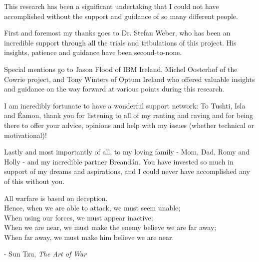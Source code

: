 \documentclass[a4paper, 12pt, oneside]{report}
\begin{document}

\thesistitlepage                            %

\thesisdeclarationpage				  		%


\thesissummarypage

\begin{thesisacknowledgments}               %
This research has been a significant undertaking that I could not have accomplished without the support and guidance of so many different people. 

First and foremost my thanks goes to Dr. Stefan Weber, who has been an incredible support through all the trials and tribulations of this project. His insights, patience and guidance have been second-to-none.

Special mentions go to Jason Flood of IBM Ireland, Michel Oosterhof of the Cowrie project, and Tony Winters of Optum Ireland who offered valuable insights and guidance on the way forward at various points during this research.

I am incredibly fortunate to have a wonderful support network: To Tushti, Isla and {\'E}amon, thank you for listening to all of my ranting and raving and for being there to offer your advice, opinions and help with my issues (whether technical or motivational)!

Lastly and most importantly of all, to my loving family - Mom, Dad, Romy and Holly - and my incredible partner Breand{\'a}n. You have invested so much in support of my dreams and aspirations, and I could never have accomplished any of this without you.
\end{thesisacknowledgments}                 %

\null\vfill
{\centering
\parbox{\textwidth}{%
   All warfare is based on deception. \\
   Hence, when we are able to attack, we must seem unable; \\
   When using our forces, we must appear inactive; \\
   When we are near, we must make the enemy believe we are far away; \\
   When far away, we must make him believe we are near.\par\bigskip
   }
  \raggedleft\Large{ - Sun Tzu, \textit{The Art of War}}\par%
  }
\vfill\vfill
\end{document}
